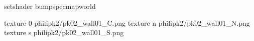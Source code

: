 setshader bumpspecmapworld

texture 0 philipk2/pk02_wall01_C.png
texture n philipk2/pk02_wall01_N.png
texture s philipk2/pk02_wall01_S.png

